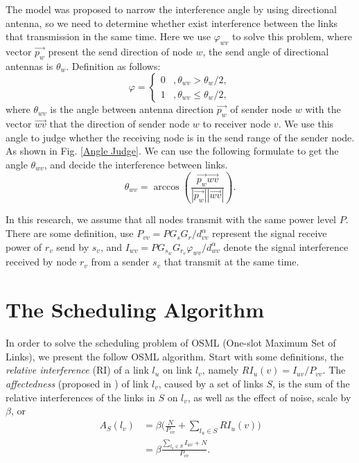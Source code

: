 \documentclass[conference]{IEEEtran}
\begin{document}
The model was proposed to narrow the interference angle by using directional antenna, so we need to determine whether exist interference between the links that transmission in the same time. Here we use $\varphi _{wv}$ to solve this problem, where vector $\vec {p_w}$ present the send direction of node $w$, the send angle of directional antennas is $\theta _w$. Definition as follows:
\[
\varphi =\left \{ \begin{split}
0 &, \theta_{wv}>\theta_w /2,\\
1 &, \theta_{wv}\leq \theta_w /2,
\end{split}
\right.
\]
where $\theta _{wv}$ is the angle between antenna direction $\vec {p_w}$ of sender node $w$ with the vector $\vec {wv}$ that the direction of sender node $w$ to receiver node $v$. We use this angle to judge whether the receiving node is in the send range of the sender node. As shown in Fig. \ref{Angle Judge}. We can use the following formulate to get the angle $\theta_{wv}$, and decide the interference between links.
\begin{equation*}
  \theta_{wv}=\arccos{(\frac{\vec{p_w} \vec{wv}}{|\vec{p_w}| |\vec{wv}|})}.
\end{equation*}

In this research, we assume that all nodes transmit with the same power level $P$. There are some definition, use $P_{vv}=PG_sG_r/d^{\alpha}_{vv}$ represent the signal receive power of $r_v$ send by $s_v$, and $I_{wv}=P G_{s_w} G_{r_v} \varphi_{wv}/d^{\alpha}_{wv}$ denote the signal interference received by node $r_v$ from a sender $s_v$ that transmit at the same time.



\section{The Scheduling Algorithm}
In order to solve the scheduling problem of OSML (One-slot Maximum Set of Links), we present the follow OSML algorithm. Start with some definitions, the \emph{relative interference} (RI) of a link $l_u$ on link $l_v$, namely $RI_u(v)=I_{uv}/P_{vv}$. The \emph{affectedness} (proposed in \cite{2}) of link $l_v$, caused by a set of links $S$, is the sum of the relative interferences of the links in $S$ on $l_v$, as well as the effect of noise, scale by $\beta$, or
\begin{equation}
\begin{split}
  A_S(l_v)&=\beta \bigg(\frac{N}{P_{vv}}+\sum _{l_u \in S}RI_u(v)\bigg)\\
  &=\beta \frac{\sum_{l_u \in S}I_{uv}+N}{P_{vv}}.
\end{split}
\end{equation}
\end{document}
